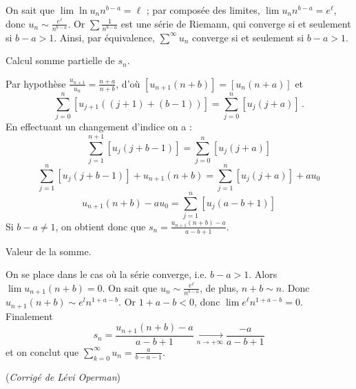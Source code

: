{{On sait que $\lim \ln{u_n n^{b-a}} = \ell$ ; par composée des limites,  $\lim u_n n^{b-a}  = e^\ell$, 
donc $u_n \sim \frac{e^\ell}{n^{b-a}}$. Or $\sum \frac{1}{n^{b-a}} $ est une série de Riemann, 
qui converge si et seulement si $b-a  > 1$.
Ainsi, par équivalence, $\sum^{\infty}u_n $ converge si et seulement si $b-a  > 1$.

Calcul somme partielle de $s_n$.

Par hypothèse $\frac{u_{n+1}}{u_n} = \frac{n+a}{n+b}$, d'où $[u_{n+1}( n+b )] = [u_n( n+a )]$ et
\[
\sum_{j=0}^n[u_{j+1}( ( j+1 )+( b-1 ) )] = \sum_{j=0}^n[u_j( j+a ) ] \, .
\]
En effectuant un changement d'indice on a :
\[
\sum_{j=1}^{n+1}[u_{j}( j+b-1 )] = \sum_{j=0}^n[u_j( j+a ) ]
\] 
\[
\sum_{j=1}^{n}[u_{j}( j+b-1 )] + u_{n+1}( n+b ) = \sum_{j=1}^n[u_j( j+a ) ] + au_0
\]
\[
u_{n+1}(n+b)-au_0=\sum_{j=1}^n[u_j(a-b+1)]
\]
Si $b-a \ne 1$, on obtient donc que $s_n = \frac{u_{n+1}(n+b)-a}{a-b+1}$.


Valeur de la somme.

 
On se place dans le cas où la série converge, i.e. $b-a>1$. Alors $\lim u_{n+1}(n+b) = 0$.
On sait que $u_n\sim\frac{e^\ell}{n^{b-a}}$, de plus, $n+b\sim n$.
Donc $u_{n+1}(n+b)\sim e^ln^{1+a-b}$. Or $1 + a - b < 0$, donc $\lim e^\ell n^{1+a-b} = 0$.
Finalement
\[
s_n = \frac{u_{n+1}(n+b)-a}{a-b+1} \xrightarrow[n \to +\infty]{}
\frac{-a}{a-b+1}
\]
et on conclut que $\sum_{k=0}^\infty{u_n} = \frac{a}{b-a-1}$.

\medskip

(\emph{Corrigé de Lévi Operman})
}
}
